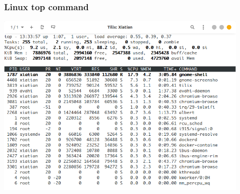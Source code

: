 \begin{frame}[fragile]
  \frametitle{Linux top command}
  \includegraphics[width=0.9\textwidth]{figure/process-top.png}
\end{frame}



